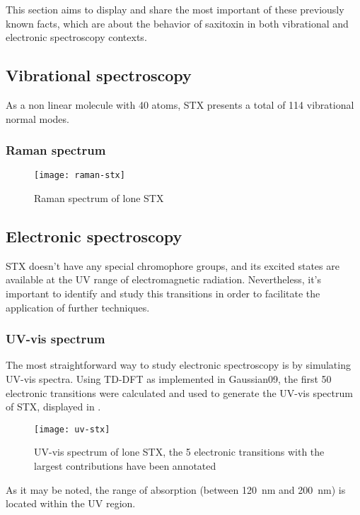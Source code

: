 This section aims to display and share the most important of these previously known facts, which are about the behavior of saxitoxin in both vibrational and electronic spectroscopy contexts.

\subsection{Vibrational spectroscopy}
As a non linear molecule with 40 atoms, STX presents a total of 114 vibrational normal modes.
\blindtext

\subsubsection{Raman spectrum}
\blindtext

\begin{figure}
    \texttt{[image: raman-stx]}
    \caption[Raman spectrum of lone STX]{Raman spectrum of lone STX}
\end{figure}


\subsection{Electronic spectroscopy}
STX doesn't have any special chromophore groups, and its excited states are available at the UV range of electromagnetic radiation.
Nevertheless, it's important to identify and study this transitions in order to facilitate the application of further techniques.

\subsubsection{UV-vis spectrum}
The most straightforward way to study electronic spectroscopy is by simulating UV-vis spectra.
Using TD-DFT as implemented in Gaussian09, the first 50 electronic transitions were calculated and used to generate the UV-vis spectrum of STX, displayed in .

\begin{figure}
    \texttt{[image: uv-stx]}
    \caption[UV-vis spectrum of lone STX]{UV-vis spectrum of lone STX, the 5 electronic transitions with the largest contributions have been annotated}
\end{figure}

As it may be noted, the range of absorption (between \SI{120}{\nano\metre} and \SI{200}{\nano\metre}) is located within the UV region.

